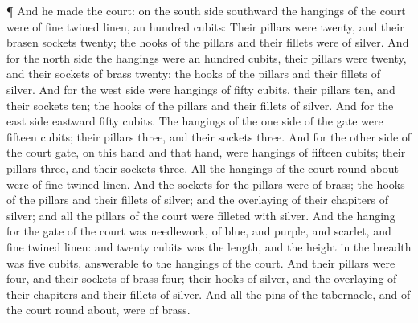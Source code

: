  ¶ And he made the court: on the south side southward the
hangings of the court were of fine twined linen, an hundred cubits:
 Their pillars were twenty, and their brasen sockets
twenty; the hooks of the pillars and their fillets were of silver.
 And for the north side the hangings were an hundred
cubits, their pillars were twenty, and their sockets of brass twenty;
the hooks of the pillars and their fillets of silver.  And
for the west side were hangings of fifty cubits, their pillars ten, and
their sockets ten; the hooks of the pillars and their fillets of silver.
 And for the east side eastward fifty cubits. 
The hangings of the one side of the gate were fifteen cubits; their
pillars three, and their sockets three.  And for the other
side of the court gate, on this hand and that hand, were hangings of
fifteen cubits; their pillars three, and their sockets three.
 All the hangings of the court round about were of fine
twined linen.  And the sockets for the pillars were of
brass; the hooks of the pillars and their fillets of silver; and the
overlaying of their chapiters of silver; and all the pillars of the
court were filleted with silver.  And the hanging for the
gate of the court was needlework, of blue, and purple, and scarlet, and
fine twined linen: and twenty cubits was the length, and the height in
the breadth was five cubits, answerable to the hangings of the court.
 And their pillars were four, and their sockets of brass
four; their hooks of silver, and the overlaying of their chapiters and
their fillets of silver.  And all the pins of the
tabernacle, and of the court round about, were of brass.

